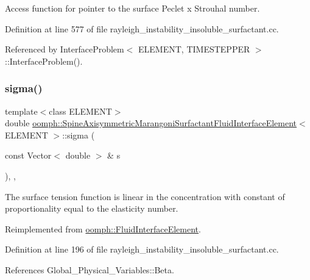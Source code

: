 Access function for pointer to the surface Peclet x Strouhal number. 



Definition at line 577 of file rayleigh\+\_\+instability\+\_\+insoluble\+\_\+surfactant.\+cc.



Referenced by Interface\+Problem$<$ E\+L\+E\+M\+E\+N\+T, T\+I\+M\+E\+S\+T\+E\+P\+P\+E\+R $>$\+::\+Interface\+Problem().

\mbox{\label{classoomph_1_1SpineAxisymmetricMarangoniSurfactantFluidInterfaceElement_a7312e78a1b5449ea2ff6d856a4fd9c46}} 
\subsubsection{\texorpdfstring{sigma()}{sigma()}}
{\footnotesize\ttfamily template$<$class E\+L\+E\+M\+E\+NT$>$ \\
double \hyperlink{classoomph_1_1SpineAxisymmetricMarangoniSurfactantFluidInterfaceElement}{oomph\+::\+Spine\+Axisymmetric\+Marangoni\+Surfactant\+Fluid\+Interface\+Element}$<$ E\+L\+E\+M\+E\+NT $>$\+::sigma (\begin{DoxyParamCaption}\item[{const Vector$<$ double $>$ \&}]{s }\end{DoxyParamCaption})\hspace{0.3cm}{\ttfamily [inline]}, {\ttfamily [protected]}, {\ttfamily [virtual]}}

The surface tension function is linear in the concentration with constant of proportionality equal to the elasticity number. 

Reimplemented from \hyperlink{classoomph_1_1FluidInterfaceElement_a7e5c3ca1eba5d4dd44c0eab9be252c2a}{oomph\+::\+Fluid\+Interface\+Element}.



Definition at line 196 of file rayleigh\+\_\+instability\+\_\+insoluble\+\_\+surfactant.\+cc.



References Global\+\_\+\+Physical\+\_\+\+Variables\+::\+Beta.



